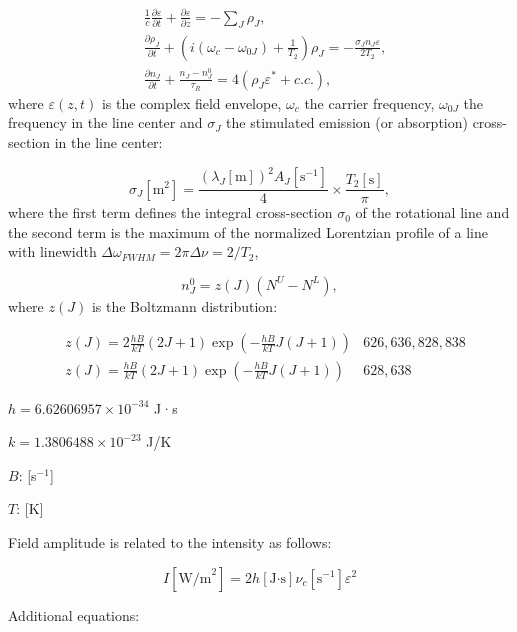 \documentclass{report}
\begin{document}
\begin{align}\label{eq:amplification}
&\frac{1}{c}\frac{\partial \varepsilon}{\partial t} + \frac{\partial \varepsilon}{\partial z} =  - \sum\limits_J {\rho _J},\nonumber\\
&\frac{\partial \rho _J}{\partial t} + \left(i(\omega _c-\omega _{0J}) + \frac{1}{T_2} \right)\rho _J =  - \frac{\sigma _J n_J \varepsilon}{2T_2},\\
&\frac{\partial n_J}{\partial t} + \frac{n_J-n_J^0}{\tau _R} = 4(\rho _J \varepsilon^* + c.c.), \nonumber
\end{align}
where $\varepsilon(z,t)$ is the complex field envelope, $\omega _c$ the carrier frequency, $\omega_{0J}$ the frequency in the line center and $\sigma_J$ the stimulated emission (or absorption) cross-section in the line center:

\begin{equation*}
{\sigma _J}[\text{m}^2] = \frac{(\lambda _J[\text{m}])^2 A_J[\text{s}^{-1}]}{4} \times \frac{T_2[\text{s}]}{\pi},
\end{equation*}
where the first term defines the integral cross-section $\sigma_0$ of the rotational line \cite{Hilborn-2002} and the second term is the maximum of the normalized Lorentzian profile of a line with linewidth $\Delta\omega _{FWHM}=2\pi\Delta\nu=2/T_2$,

\begin{equation*}
n_J^0 = z(J)(N^U-N^L),
\end{equation*}
where $z(J)$ is the Boltzmann distribution:

\begin{align*}
&z(J) = 2\frac{hB}{kT}(2J+1)\exp \left(-\frac{hB}{kT}J(J+1)\right)&626, 636, 828, 838\\
&z(J) = \frac{hB}{kT}(2J+1)\exp \left(-\frac{hB}{kT}J(J+1)\right)&628, 638
\end{align*}

$h = 6.62606957\times 10^{-34}$ J·s

$k = 1.3806488\times 10^{-23}$ J/K

$B$: [s$^{-1}$]

$T$: [K]

Field amplitude is related to the intensity as follows:

\begin{equation}\label{eq:I}
I[\text{W/m}^2] = 2 h[\text{J·s}] \nu _c[\text{s}^{-1}] \varepsilon ^2
\end{equation}

Additional equations:
\end{document}
